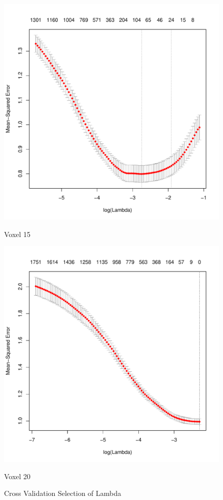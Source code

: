 \documentclass[english]{amsart}
\begin{document}
\begin{figure}[H]
  \includegraphics[width=\linewidth]{cv_lasso15.pdf}
  \caption{Voxel 15}
\endminipage\hfill
\vspace{-5mm}
  \includegraphics[width=\linewidth]{cv_lasso20.pdf}
  \caption{Voxel 20}
\endminipage
\caption{Cross Validation Selection of Lambda}
\end{figure}
\vspace{-20mm}
\end{document}
